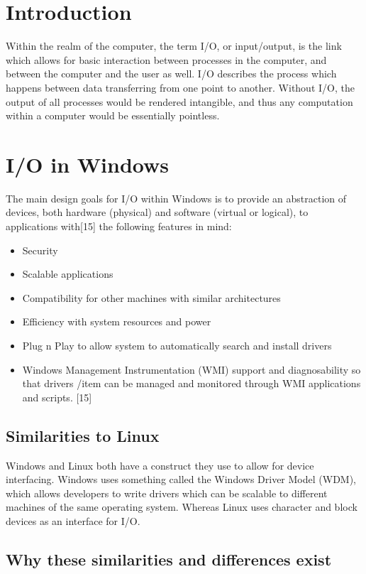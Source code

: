 \documentclass[onecolumn, draftclsnofoot,10pt, compsoc]{IEEEtran}
\begin{document}
\section{Introduction}
Within the realm of the computer, the term I/O, or input/output, is the link which allows for basic interaction between processes in the computer, and between the computer and the user as well. I/O describes the process which happens between data transferring from one point to another. Without I/O, the output of all processes would be rendered intangible, and thus any computation within a computer would be essentially pointless.


\section{I/O in Windows}
The main design goals for I/O within Windows is to provide an abstraction of devices, both hardware (physical) and software (virtual or logical), to applications with[15] the following features in mind:
\begin{itemize}
\item Security
\item Scalable applications
\item Compatibility for other machines with similar architectures
\item Efficiency with system resources and power
\item Plug n Play to allow system to automatically search and install drivers 
\item Windows Management Instrumentation (WMI) support and diagnosability so that drivers /item can be managed and monitored through WMI applications and scripts. [15]
\end{itemize}


\subsection{Similarities to Linux}

Windows and Linux both have a construct they use to allow for device interfacing. Windows uses something called the Windows Driver Model (WDM), which allows developers to write drivers which can be scalable to different machines of the same operating system. Whereas Linux uses character and block devices as an interface for I/O. 



\subsection{Why these similarities and differences exist}
\end{document}
